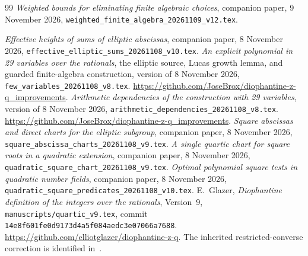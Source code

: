 \documentclass[11pt,a4paper]{article}
\begin{document}
\begin{thebibliography}{99}
\emph{Weighted bounds for eliminating finite algebraic choices},
companion paper, 9 November 2026,
\nolinkurl{weighted_finite_algebra_20261109_v12.tex}.

\emph{Effective heights of sums of elliptic abscissas},
companion paper, 8 November 2026,
\nolinkurl{effective_elliptic_sums_20261108_v10.tex}.
\emph{An explicit polynomial in 29 variables over the rationals},
the elliptic source, Lucas growth lemma, and guarded finite-algebra
construction, version of 8 November 2026,
\nolinkurl{few_variables_20261108_v8.tex}.
\url{https://github.com/JoseBrox/diophantine-z-q_improvements}.
\emph{Arithmetic dependencies of the construction with 29 variables},
version of 8 November 2026,
\nolinkurl{arithmetic_dependencies_20261108_v8.tex}.
\url{https://github.com/JoseBrox/diophantine-z-q_improvements}.
\emph{Square abscissas and direct charts for the elliptic subgroup},
companion paper, 8 November 2026,
\nolinkurl{square_abscissa_charts_20261108_v9.tex}.
\emph{A single quartic chart for square roots in a quadratic extension},
companion paper, 8 November 2026,
\nolinkurl{quadratic_square_chart_20261108_v9.tex}.
\emph{Optimal polynomial square tests in quadratic number fields},
companion paper, 8 November 2026,
\nolinkurl{quadratic_square_predicates_20261108_v10.tex}.
E.~Glazer, \emph{Diophantine definition of the integers over the
rationals}, Version~9, \nolinkurl{manuscripts/quartic_v9.tex},
commit \nolinkurl{14e8f601fe0d9173d4a5f084aedc3e07066a7688}.
\url{https://github.com/elliotglazer/diophantine-z-q}.
The inherited restricted-converse correction is identified
in~\cite{Dependencies}.
\end{thebibliography}
\end{document}
